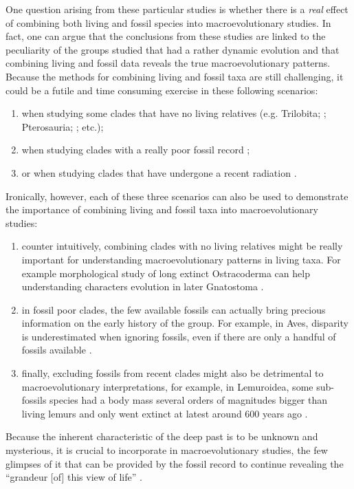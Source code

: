 One question arising from these particular studies is whether there is a \textit{real} effect of combining both living and fossil species into macroevolutionary studies.
In fact, one can argue that the conclusions from these studies are linked to the peculiarity of the groups studied that had a rather dynamic evolution and that combining living and fossil data reveals the true macroevolutionary patterns.
Because the methods for combining living and fossil taxa are still challenging, it could be a futile and time consuming exercise in these following scenarios:
\begin{enumerate}
\item when studying some clades that have no living relatives (e.g. Trilobita; \citealt{hopkinsdecoupling2013}; Pterosauria; \citealt{Butler2012}; etc.);
\item when studying clades with a really poor fossil record \citep[e.g. Aves where there are three orders of magnitude more known living than fossil taxa;][]{jetzthe2012,Mitchell2015};
\item or when studying clades that have undergone a recent radiation \citep[e.g. Cichlidae][]{Genner01052007}.
\end{enumerate}

Ironically, however, each of these three scenarios can also be used to demonstrate the importance of combining living and fossil taxa into macroevolutionary studies:
\begin{enumerate}
\item counter intuitively, combining clades with no living relatives might be really important for understanding macroevolutionary patterns in living taxa. For example morphological study of long extinct Ostracoderma can help understanding characters evolution in later Gnatostoma \citep{Janvier2015}.
\item in fossil poor clades, the few available fossils can actually bring precious information on the early history of the group. For example, in Aves, disparity is underestimated when ignoring fossils, even if there are only a handful of fossils available \citep[e.g. 58 fossil genera against 604 living ones;][]{Mitchell2015}.
\item finally, excluding fossils from recent clades might also be detrimental to macroevolutionary interpretations, for example, in Lemuroidea, some sub-fossils species had a body mass several orders of magnitudes bigger than living lemurs \citep{hartwig2002primate,Jungers2008} and only went extinct at latest around 600 years ago \citep{goodman2003introduction}.
\end{enumerate}

Because the inherent characteristic of the deep past is to be unknown and mysterious, it is crucial to incorporate in macroevolutionary studies, the few glimpses of it that can be provided by the fossil record to continue revealing the ``grandeur [of] this view of life'' \citep{darwin}.

%